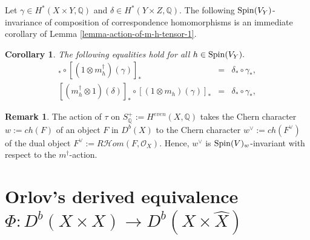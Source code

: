 \documentclass[12pt]{amsart}
\numberwithin{equation}{subsection}
\theoremstyle{plain}
\newtheorem{cor}[thm]{Corollary}
\newtheorem{lem}[thm]{Lemma}
\theoremstyle{definition}
\newtheorem{rem}[thm]{Remark}
\newcommand{\QQ}{{\mathbb Q}}
\newcommand{\Spin}{{\rm Spin}}
\newcommand{\StructureSheaf}[1]{{\mathcal O}_{#1}}
\newcommand{\SheafHom}{{\mathcal H}om}
\begin{document}


Let $\gamma\in H^*(X\times Y,\QQ)$ and $\delta\in H^*(Y\times Z,\QQ)$.
The following $\Spin(V_Y)$-invariance of composition of correspondence homomorphisms is an immediate corollary of Lemma \ref{lemma-action-of-m-h-tensor-1}.

\begin{cor}
\label{cor-Spin-V-Y-invariance}
The following equalities hold for all $h\in \Spin(V_Y).$
\begin{eqnarray*}
[(m_h\otimes 1)(\delta)]_*\circ [(1\otimes m_h^\dagger)(\gamma)]_*&=&\delta_*\circ\gamma_*,
\\
{}[(m^\dagger_h\otimes 1)(\delta)]_*\circ [(1\otimes m_h)(\gamma)]_*&=&\delta_*\circ\gamma_*,
\end{eqnarray*}
\end{cor}


\begin{rem}
\label{rem-invariance-of-w-vee}
The action of $\tau$ on $S^+_\QQ:=H^{even}(X,\QQ)$ takes the Chern character $w:=ch(F)$ of an object $F$ in $D^b(X)$ to the Chern character $w^\vee:=ch(F^\vee)$ of the dual object 
$F^\vee:=R\SheafHom(F,\StructureSheaf{X})$. 
Hence, $w^\vee$ is $\Spin(V)_w$-invariant with respect to the $m^\dagger$-action.
\end{rem}


% 
\section{Orlov's derived equivalence $\Phi:D^b(X\times X)\rightarrow D^b(X\times\hat{X})$}
\label{section-Orlov-equivalence}
\end{document}

